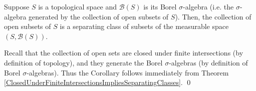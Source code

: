 \begin{corollary}\quad
Suppose $S$ is a topological space and $\mathcal{B}(S)$ is its Borel $\sigma$-algebra
(i.e. the $\sigma$-algebra generated by the collection of open subsets of $S$).
Then, the collection of open subsets of $S$ is a separating class of subsets of
the measurable space $\left(S,\mathcal{B}(S)\right)$.
\end{corollary}
\proof
Recall that the collection of open sets are closed under finite intersections (by definition of topology),
and they generate the Borel $\sigma$-algebras (by definition of Borel $\sigma$-algebras).
Thus the Corollary follows immediately from
Theorem \ref{ClosedUnderFiniteIntersectionsImpliesSeparatingClasses}.
\qed

